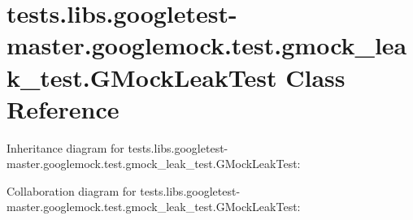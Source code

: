 \hypertarget{classtests_1_1libs_1_1googletest-master_1_1googlemock_1_1test_1_1gmock__leak__test_1_1GMockLeakTest}{}\section{tests.\+libs.\+googletest-\/master.googlemock.\+test.\+gmock\+\_\+leak\+\_\+test.\+G\+Mock\+Leak\+Test Class Reference}
\label{classtests_1_1libs_1_1googletest-master_1_1googlemock_1_1test_1_1gmock__leak__test_1_1GMockLeakTest}


Inheritance diagram for tests.\+libs.\+googletest-\/master.googlemock.\+test.\+gmock\+\_\+leak\+\_\+test.\+G\+Mock\+Leak\+Test\+:


Collaboration diagram for tests.\+libs.\+googletest-\/master.googlemock.\+test.\+gmock\+\_\+leak\+\_\+test.\+G\+Mock\+Leak\+Test\+:
